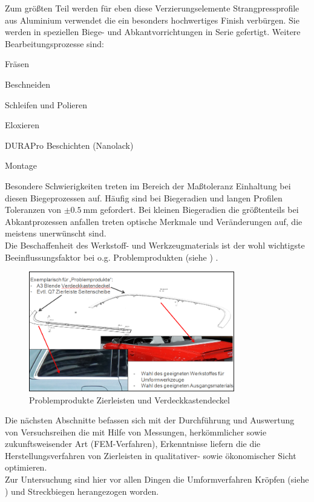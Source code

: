 \documentclass[12pt,a4paper,parskip]{scrartcl}
\begin{document}
Zum größten Teil werden für eben diese Verzierungselemente
Strangpressprofile aus Aluminium verwendet die ein besonders hochwertiges Finish verbürgen. Sie werden in speziellen Biege- und Abkantvorrichtungen in Serie gefertigt.
 Weitere Bearbeitungsprozesse sind: \begin{itemize*}
 \item Fräsen
 \item Beschneiden
 \item Schleifen und Polieren
 \item Eloxieren
 \item DURAPro Beschichten (Nanolack)
 \item Montage
 \end{itemize*}
   Besondere Schwierigkeiten treten im Bereich der Maßtoleranz Einhaltung bei diesen Biegeprozessen auf. Häufig sind bei  Biegeradien und langen Profilen Toleranzen von $\pm \SI{0.5}{\milli\meter}$ gefordert. Bei kleinen Biegeradien die größtenteils bei Abkantprozessen anfallen treten optische Merkmale und Veränderungen auf, die meistens unerwünscht sind.\\
 Die Beschaffenheit des Werkstoff- und Werkzeugmaterials ist der wohl wichtigste Beeinflussungsfaktor bei o.g. Problemprodukten (siehe ) .
 \begin{figure}[hbtp]
 \centering
 \includegraphics[width=0.8\textwidth]{ZierleisteVerdeckklappendeckel}
 \caption{Problemprodukte Zierleisten und Verdeckkastendeckel}
 \label{fig:Verdeckkastendeckel}
 \end{figure}

Die nächsten Abschnitte befassen sich mit der Durchführung und Auswertung von Versuchsreihen die mit Hilfe von Messungen, herkömmlicher sowie zukunftsweisender Art (FEM-Verfahren), Erkenntnisse liefern  die die Herstellungsverfahren von Zierleisten  in qualitativer- sowie ökonomischer Sicht  optimieren.\\
Zur Untersuchung   sind hier vor allen Dingen die Umformverfahren  Kröpfen (siehe )  und Streckbiegen herangezogen worden. 
\end{document}
